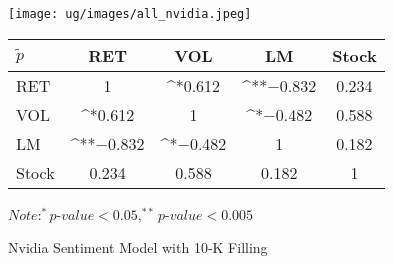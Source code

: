 \documentclass[logo,bsc,singlespacing,parskip]{infthesis}
\begin{document}
\begin{figure}[htpp]
\centering
\begin{minipage}{0.90\textwidth}
    \centering
    \texttt{[image: ug/images/all\_nvidia.jpeg]}
    \caption{Nvidia Sentiment Model with 10-K Filling}
    \label{fig:all_nvidia}
\end{minipage}%
\hfill
\vspace{30pt} %
\begin{minipage}{0.9\textwidth}

    \begin{minipage}[t]{0.9\textwidth}
    \centering
    \begin{tabular}{lcccc}
    \label{tab:all_nvidia_corr}
    $\tilde{p}$      & RET       & VOL       & LM        & Stock    \\ \hline
    RET    & 1  & ^{*}0.612  & ^{**}$-$0.832 & 0.234 \\
    VOL    & ^{*}0.612   & 1  & ^{*}$-$0.482 & 0.588  \\
    LM    & ^{**}$-$0.832 & ^{*}$-$0.482 & 1  & 0.182 \\
    Stock  & 0.234 & 0.588  & 0.182 & 1  \\ \hline
    \end{tabular}
    \medskip
    $\textit{Note}: ^{*}p$-$value<0.05, ^{**}p$-$value<0.005$
    \end{minipage}

\end{minipage}
\end{figure}

\end{document}

